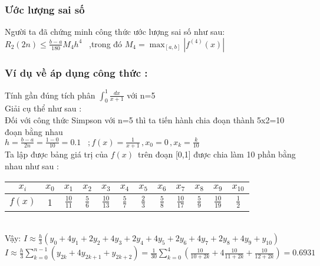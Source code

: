 \documentclass[14pt,a4paper]{article}
\begin{document}
 \subsubsection{Ước lượng sai số }
 Người ta đã chứng minh công thức ước lượng sai số như sau:\\
 \vspace{9pt} \hspace*{35pt}   ${\displaystyle R_2(2n) \leq \frac{b-a}{180}M_4 h^4}$ \, ,trong đó ${\displaystyle  M_4 = \max_{[a,b]}|f^{(4)}(x)|}$
 \subsubsection{Ví dụ về áp dụng công thức :}
\vspace{9pt}Tính gần đúng tích phân ${\displaystyle \int_{0}^{1}\frac{dx}{x+1}}$ với n=5 \\
\hspace*{30pt}Giải cụ thể như sau : \\
\hspace*{30pt}Đối với công thức Simpson với n=5 thì ta tiến hành chia đoạn thành 5x2=10 đoạn bằng nhau  \\
\hspace*{30pt} ${\displaystyle h=\frac{b-a}{2n} = \frac{1-0}{10} = 0.1 \,\,\,\,\, ; f(x)=\frac{1}{x+1}\, ,x_0= 0\, ,  x_k= \frac{k}{10}}$\\ 
\hspace*{30pt} Ta lập được bảng giá trị của ${\displaystyle f(x) \,}$ trên đoạn [0,1] được chia làm 10 phần bằng nhau như sau : \vspace{6pt}\\
\begin{tabular}{ c|c|c|c|c|c|c|c|c|c|c|c}

	${\displaystyle x_i}$&${\displaystyle x_0}$& ${\displaystyle x_1}$ & ${\displaystyle x_2}$ &${\displaystyle x_3}$ &${\displaystyle x_4 }$&${\displaystyle x_5}$ &${\displaystyle x_6}$ &${\displaystyle x_7 }$&${\displaystyle x_8}$ &${\displaystyle x_9}$ &${\displaystyle x_{10} }$ \vspace{6pt}\\
	\hline 
	${\displaystyle f(x)}$& 1 &${\displaystyle \frac{10}{11}}$ &${\displaystyle \frac{5}{6} }$&${\displaystyle \frac{10}{13}}$ &${\displaystyle \frac{5}{7}}$ &${\displaystyle \frac{2}{3} }$ &${\displaystyle \frac{5}{8}}$ &${\displaystyle \frac{10}{17} }$&${\displaystyle \frac{5}{9}}$ &${\displaystyle \frac{10}{19}}$ &${\displaystyle\frac{1}{2} }$ \\

\end{tabular} \vspace{9pt} \\
\hspace*{30pt} Vậy: ${\displaystyle I \approx \frac{h}{3}(y_0 +4y_1+ 2y_2+4y_3+2y_4+4y_5+2y_6+4y_7+2y_8+4y_9+y_{10})}$\\
\hspace*{30pt}${\displaystyle I \approx \frac{h}{3} \sum_{k=0}^{n-1}(y_{2k}+4y_{2k+1}+y_{2k+2}) = \frac{1}{30} \sum_{k=0}^{4}(\frac{10}{10+2k}+4\frac{10}{11+2k}+\frac{10}{12+2k}) =0.6931}$
\newpage
\end{document}
